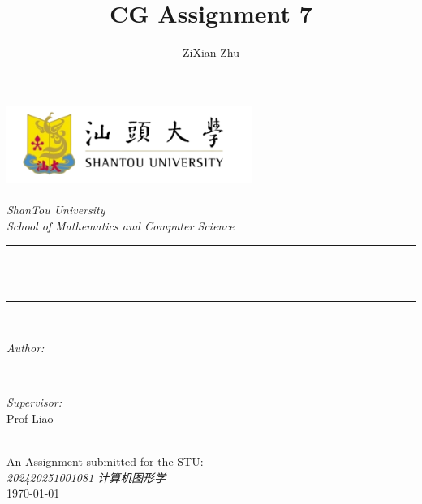 
\title{CG Assignment 7}
\author{\textup{ZiXian-Zhu}}


\begin{titlepage}
    \newcommand{\HRule}{\rule{\linewidth}{0.5mm}}
    \pagecolor{gray!10} %
    \includegraphics[width=8cm]{figures/stu_logo_3-removebg-preview.png}\\[1cm] 
    \center 
    \quad\\[1.5cm]
    \textsl{\Large ShanTou University}\\[0.5cm] 
    \textsl{\large School of Mathematics and Computer Science}\\[0.5cm] 
    \makeatletter
    \HRule \\[0.4cm]
    { \huge \bfseries \@title}\\[0.4cm] 
    \HRule \\[1.5cm]
    \begin{minipage}{0.4\textwidth}
        \begin{flushleft} \large
            \emph{Author:}\\
            \@author 
        \end{flushleft}
    \end{minipage}
    ~
    \begin{minipage}{0.4\textwidth}
        \begin{flushright} \large
            \emph{Supervisor:} \\
            \textup{Prof Liao}
        \end{flushright}
    \end{minipage}\\[3cm]
    \makeatother
    {\large An Assignment submitted for the STU:}\\[0.5cm]
    {\large \emph{202420251001081 计算机图形学}}\\[0.5cm]
    {\large \today}\\[2cm] 
    \vfill 
\end{titlepage}


